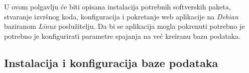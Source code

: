 %		
%			
%			

		U ovom polgavlju će biti opisana instalacija potrebnih softverskih paketa, stvaranje izvršnog koda, konfiguracija i pokretanje web aplikacije na \textit{Debian} baziranom \textit{Linux} poslužitelju. Da bi se aplikacija mogla pokrenuti potrebno je potrebno je konfigurirati parametre spajanja na već kreiranu bazu podataka.
		
		\subsection{Instalacija i konfiguracija baze podataka}
		
		
		

			
			
			\eject 